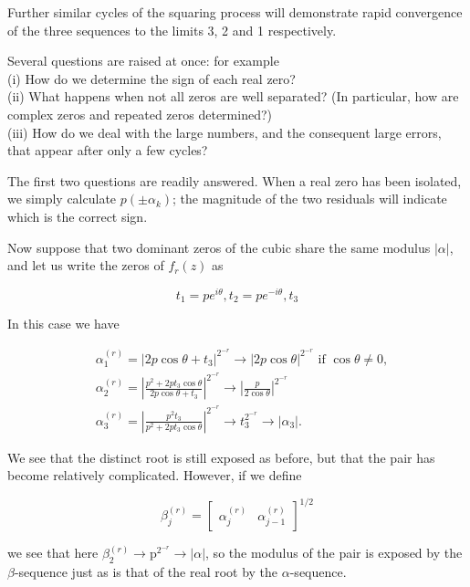 \documentclass[10pt]{article}
\begin{document}
Further similar cycles of the squaring process will demonstrate rapid convergence of the three sequences to the limits 3, 2 and 1 respectively.

Several questions are raised at once: for example\\
(i) How do we determine the sign of each real zero?\\
(ii) What happens when not all zeros are well separated? (In particular, how are complex zeros and repeated zeros determined?)\\
(iii) How do we deal with the large numbers, and the consequent large errors, that appear after only a few cycles?

The first two questions are readily answered. When a real zero has been isolated, we simply calculate $p\left( \pm \alpha_{k}\right)$; the magnitude of the two residuals will indicate which is the correct sign.

Now suppose that two dominant zeros of the cubic share the same modulus $|\alpha|$, and let us write the zeros of $f_{r}(z)$ as

$$
t_{1}=p e^{i \theta}, t_{2}=p e^{-i \theta}, t_{3}
$$

In this case we have

$$
\begin{aligned}
& \alpha_{1}^{(r)}=\left|2 p \cos \theta+t_{3}\right|^{2^{-r}} \rightarrow|2 p \cos \theta|^{2^{-r}} \text { if } \cos \theta \neq 0, \\
& \alpha_{2}^{(r)}=\left|\frac{p^{2}+2 p t_{3} \cos \theta}{2 p \cos \theta+t_{3}}\right|^{2^{-r}} \rightarrow\left|\frac{p}{2 \cos \theta}\right|^{2^{-r}} \\
& \alpha_{3}^{(r)}=\left|\frac{p^{2} t_{3}}{p^{2}+2 p t_{3} \cos \theta}\right|^{2^{-r}} \rightarrow t_{3}^{2^{-r}} \rightarrow\left|\alpha_{3}\right| .
\end{aligned}
$$

We see that the distinct root is still exposed as before, but that the pair has become relatively complicated. However, if we define

$$
\beta_{j}^{(r)}=\left[\begin{array}{cc}
\alpha_{j}^{(r)} & \alpha_{j-1}^{(r)}
\end{array}\right]^{1 / 2}
$$

we see that here $\beta_{2}^{(r)} \rightarrow \mathrm{p}^{2^{-r}} \rightarrow|\alpha|$, so the modulus of the pair is exposed by the $\beta$-sequence just as is that of the real root by the $\alpha$-sequence.
\end{document}
